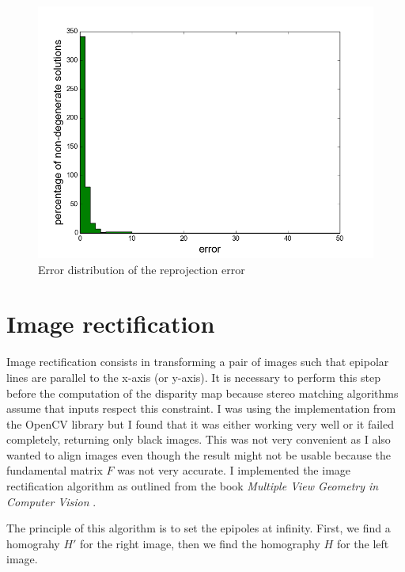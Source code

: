 \documentclass[11pt]{report}
\begin{document}
\begin{figure}[H]
    \begin{center}
        \includegraphics[scale=.45]{images/error_distribution.png}
    \end{center}
    \caption{Error distribution of the reprojection error}
  \label{fig:error_distribution}
\end{figure}

\section{Image rectification}

Image rectification consists in transforming a pair of images such that epipolar lines are parallel to the x-axis (or y-axis). It is necessary to perform this step before the computation of the disparity map because stereo matching algorithms \cite{Stefano02afast} \cite{SGBM} assume that inputs respect this constraint.
I was using the implementation from the OpenCV library but I found that it was either working very well or it failed completely, returning only black images. This was not very convenient as I also wanted to align images even though the result might not be usable  because the fundamental matrix $F$ was not very accurate. I implemented the image rectification algorithm as outlined from the book \textit{Multiple View Geometry in Computer Vision} \cite{Geom}.

The principle of this algorithm is to set the epipoles at infinity. First, we find a homograhy $H'$ for the right image, then we find the homography $H$ for the left image.
\end{document}
